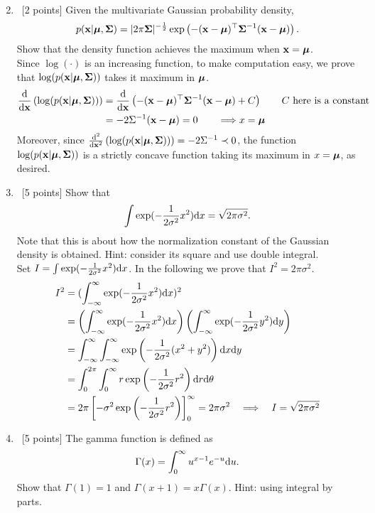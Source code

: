\documentclass[12pt, fullpage,letterpaper]{article}
\def\blackblue{\color{black!40!blue}}
\begin{document}
\begin{enumerate}
\begin{enumerate}
{\begin{align*}
	\end{align*}
	}
\end{enumerate}
\item~[2 points] Given the multivariate Gaussian probability density, $$p({\bf x}|\boldsymbol{\mu}, \boldsymbol{\Sigma}) = |2\pi \boldsymbol{\Sigma}|^{-\frac{1}{2}}\exp\left(- ({\bf x}-\boldsymbol{\mu})^\top\boldsymbol{\Sigma}^{-1}({\bf x}-\boldsymbol{\mu})\right).$$ Show that the density function achieves the maximum when ${\bf x} = \boldsymbol{\mu}$.  \\
{\blackblue\noindent 
Since $\log(\cdot)$ is an increasing function, to make computation easy, we prove that $\log(p({\bf x}|\boldsymbol{\mu}, \boldsymbol{\Sigma}))$ takes it maximum in $\boldsymbol{\mu}$. 
\begin{align*}
{{\rm d}\over {\rm d}{\bf x}}\left(\log(p({\bf x}|\boldsymbol{\mu}, \boldsymbol{\Sigma}))\right)
& ={{\rm d}\over {\rm d}{\bf x}}\left( - ({\bf x}-\boldsymbol{\mu})^\top\boldsymbol{\Sigma}^{-1}({\bf x}-\boldsymbol{\mu}) + C\right) \qquad\mbox{$C$ here is a constant}\\
& = -2\Sigma^{-1}({\bf x}-\boldsymbol{\mu}) = 0\quad\quad \Longrightarrow x = \boldsymbol{\mu}
\end{align*}
Moreover,  since ${{\rm d}^2\over {\rm d}{\bf x}^2}\left(\log(p({\bf x}|\boldsymbol{\mu}, \boldsymbol{\Sigma}))\right) = -2\Sigma^{-1} \prec 0$, the function 
$\log(p({\bf x}|\boldsymbol{\mu}, \boldsymbol{\Sigma}))$ is a strictly concave function taking its maximum in $x = \boldsymbol{\mu}$, as desired. 
}
\item~[5 points] Show that $$\int \exp(-\frac{1}{2\sigma^2}x^2) {\rm d} x = \sqrt{2\pi \sigma^2}.$$ Note that this is about  how the normalization constant of the Gaussian density is obtained. Hint: consider its square and use double integral. \\
{\blackblue\noindent 
Set $I= \int \exp(-\frac{1}{2\sigma^2}x^2) {\rm d} x$. In the following we prove that $I^2 =  2\pi\sigma^2$.
\begin{align*}
I^2 & = (\int_{-\infty}^{\infty} \exp(-\frac{1}{2\sigma^2}x^2) {\rm d} x)^2 \\
& = \left(\int_{-\infty}^{\infty} \exp(-\frac{1}{2\sigma^2}x^2) {\rm d} x\right)\left( \int_{-\infty}^{\infty} \exp(-\frac{1}{2\sigma^2}y^2) {\rm d} y\right)\\
& = \int_{-\infty}^{\infty} \int_{-\infty}^{\infty} \exp\left(-\frac{1}{2\sigma^2}(x^2+y^2)\right){\rm d} x{\rm d} y\\
& = \int_{0}^{2\pi} \int_{0}^{\infty} r\exp\left(-\frac{1}{2\sigma^2}r^2\right){\rm d} r{\rm d} \theta\\
& = 2\pi\left[-\sigma^2\exp\left(-\frac{1}{2\sigma^2}r^2\right)\right]_0^\infty = 2\pi\sigma^2 \quad \Longrightarrow\quad I = \sqrt{2\pi \sigma^2}
\end{align*}
}
\item~[5 points] The gamma function is defined as $$\Gamma(x) = \int_0^\infty u^{x-1}e^{-u} {\rm d} u.$$ Show that $\Gamma(1) = 1$ and $\Gamma(x+1) = x\Gamma(x)$. Hint: using integral by parts. 

\end{enumerate}
\end{document}
